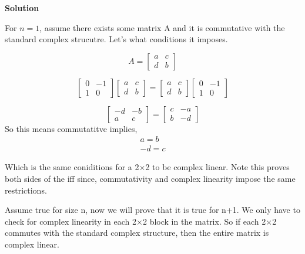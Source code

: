 \documentclass[11pt]{article}
\newcommand\0{\mathbf{0}}
\newcommand\<{\langle}
\renewcommand\>{\rangle}
\begin{document}
\begin{enumerate}
\textbf{Solution}

For $n=1$, assume there exists some matrix A and it is commutative with the standard complex strucutre. Let's what
conditions it imposes.

$$
A = \begin{bmatrix}
  a & c\\
  d & b
\end{bmatrix}
$$

$$
\begin{bmatrix}
  0 & -1\\
  1 & 0
\end{bmatrix}
\begin{bmatrix}
  a & c\\
  d & b
\end{bmatrix}=
\begin{bmatrix}
  a & c\\
  d & b
\end{bmatrix}
\begin{bmatrix}
  0 & -1\\
  1 & 0
\end{bmatrix}
$$

$$
\begin{bmatrix}
  -d & -b\\
  a & c
\end{bmatrix}=
\begin{bmatrix}
  c & -a\\
  b & -d
\end{bmatrix}
$$
So this means commutatitve implies,\\
\begin{align*}
a=b\\
-d=c 
\end{align*}

Which is the same coniditions for a 2$\times$2 to be complex linear.
Note this proves both sides of the iff since, commutativity and complex linearity impose the same restrictions.

Assume true for size n, now we will prove that it is true for n+1. We only have
to check for complex linearity in each 2$\times$2 block in the matrix. So if 
each 2$\times$2 commutes with the standard complex structure, then the entire 
matrix is complex linear.


\end{enumerate}
\end{document}
